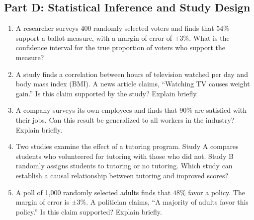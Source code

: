 \documentclass[14pt]{extarticle}
\begin{document}
\subsection*{Part D: Statistical Inference and Study Design}
\begin{enumerate}
  \item A researcher surveys 400 randomly selected voters and finds that \(54\%\) support a ballot measure, with a margin of error of \(\pm 3\%\). What is the confidence interval for the true proportion of voters who support the measure?

  \item A study finds a correlation between hours of television watched per day and body mass index (BMI). A news article claims, ``Watching TV causes weight gain.'' Is this claim supported by the study? Explain briefly.

  \item A company surveys its own employees and finds that \(90\%\) are satisfied with their jobs. Can this result be generalized to all workers in the industry? Explain briefly.

  \item Two studies examine the effect of a tutoring program. Study A compares students who volunteered for tutoring with those who did not. Study B randomly assigns students to tutoring or no tutoring. Which study can establish a causal relationship between tutoring and improved scores?

  \item A poll of 1{,}000 randomly selected adults finds that \(48\%\) favor a policy. The margin of error is \(\pm 3\%\). A politician claims, ``A majority of adults favor this policy.'' Is this claim supported? Explain briefly.
\end{enumerate}
\end{document}
